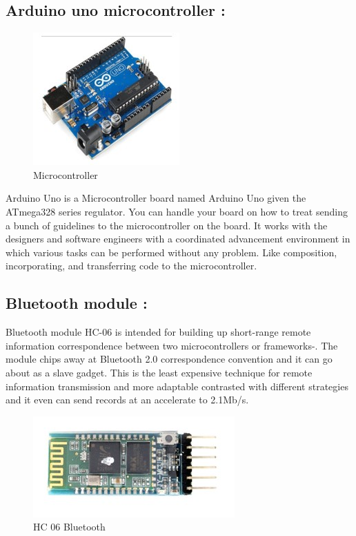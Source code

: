 \documentclass[conference]{IEEEtran}
\begin{document}
\subsection{Arduino uno microcontroller :}
\begin{figure}[htbp]
	\centerline{\includegraphics{Aurdio_uno}}
	\caption{Microcontroller}
	\label{fig}
\end{figure}
Arduino Uno is a Microcontroller board named Arduino Uno given the ATmega328 series regulator. You can handle your board on how to treat sending a bunch of guidelines to the microcontroller on the board\cite{b7}. It works with the designers and software engineers with a coordinated advancement environment in which various tasks can be performed without any problem. Like composition, incorporating, and transferring code to the microcontroller\cite{b8}.

\subsection{Bluetooth module :}
Bluetooth module HC-06 is intended for building up short-range remote information correspondence between two microcontrollers or frameworks\cite{b1}-\cite{b2}. The module chips away at Bluetooth 2.0 correspondence convention and it can go about as a slave gadget. This is the least expensive technique for remote information transmission and more adaptable contrasted with different strategies and it even can send records at an accelerate to 2.1Mb/s.
\begin{figure}[htbp]
	\centerline{\includegraphics{Bluetooth_module}}
	\caption{HC 06 Bluetooth}
	\label{fig}
\end{figure}
\end{document}

